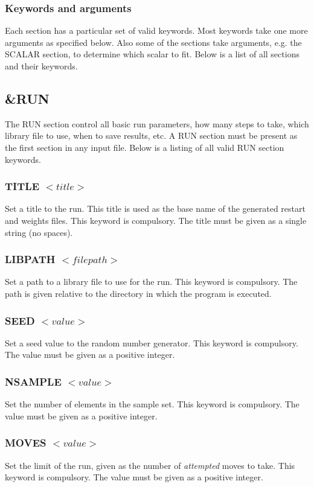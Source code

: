 \documentclass[a4paper, 10pt]{article}
\begin{document}
\subsubsection{Keywords and arguments}
Each section has a particular set of valid keywords. Most keywords
take one more arguments as specified below. Also some of the
sections take arguments, e.g. the SCALAR section, to determine which
scalar to fit. Below is a list of all sections and their keywords.

\subsection{\&RUN}
The RUN section control all basic run parameters, how many steps to
take, which library file to use, when to save results, etc. A RUN
section  must be present as the first section in any input file.
Below is a listing of all valid RUN section keywords.

\subsubsection{TITLE $<title>$}
Set a title to the run. This title is used as the base name of the
generated restart and weights files. This keyword is compulsory. The
title must be given as a single string (no spaces).

\subsubsection{LIBPATH $<filepath>$}
Set a path to a library file to use for the run. This
keyword is compulsory. The path is given
relative to the directory in which the program is executed.

\subsubsection{SEED $<value>$}
Set a seed value to the random number generator. This keyword is
compulsory. The value must be given as a positive integer.

\subsubsection{NSAMPLE $<value>$}
Set the number of elements in the sample set. This keyword is
compulsory. The value must be given as a positive integer.

\subsubsection{MOVES $<value>$}
Set the limit of the run, given as the number of {\it attempted} moves to take.
This keyword is compulsory. The value must be given as a positive integer.
\end{document}
